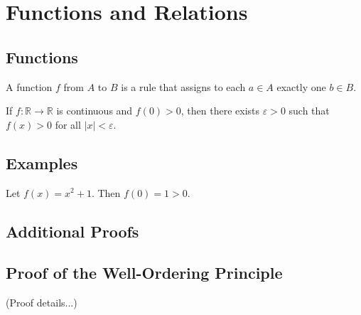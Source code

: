 \documentclass[
    11pt,
    fleqn,
    a4paper
]{mathbook}
\begin{document}
\chapter{Functions and Relations}

\section{Functions}
A function $f$ from $A$ to $B$ is a rule that assigns to each $a \in A$ exactly one $b \in B$.

\begin{theorem}
If $f: \mathbb{R} \to \mathbb{R}$ is continuous and $f(0) > 0$, then there exists $\varepsilon > 0$ such that $f(x) > 0$ for all $|x| < \varepsilon$.
\end{theorem}

\section{Examples}
\begin{example}
Let $f(x) = x^2 + 1$. Then $f(0) = 1 > 0$.
\end{example}


\begin{appendices}
\chapter{Additional Proofs}
\section{Proof of the Well-Ordering Principle}
(Proof details...)
\end{appendices}
\end{document}
